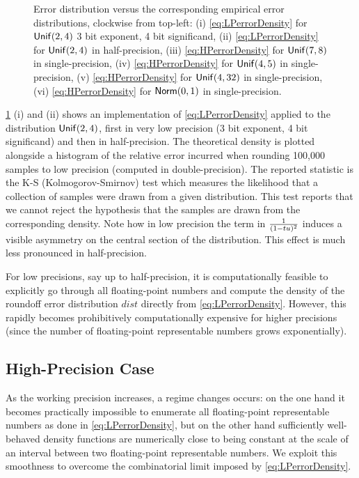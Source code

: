 \begin{figure}[tb]
\begin{tabular}{l l l}
\end{tabular}
\caption{Error distribution versus the corresponding empirical error distributions, clockwise from top-left: (i) \cref{eq:LPerrorDensity} for $\mathsf{Unif}(2,4)$ 3 bit exponent,  4 bit significand,  (ii) \cref{eq:LPerrorDensity} for $\mathsf{Unif}(2,4)$ in half-precision,  (iii) \cref{eq:HPerrorDensity} for $\mathsf{Unif}(7,8)$ in single-precision, (iv) \cref{eq:HPerrorDensity} for $\mathsf{Unif}(4,5)$ in single-precision, (v) \cref{eq:HPerrorDensity} for $\mathsf{Unif}(4,32)$ in single-precision, (vi) \cref{eq:HPerrorDensity} for $\mathsf{Norm}(0,1)$ in single-precision.}
\label{fig:error_dist}
\end{figure}

\cref{fig:error_dist} (i) and (ii) shows an implementation of \cref{eq:LPerrorDensity} applied to the distribution $\mathsf{Unif}(2,4)$, first in very low precision (3 bit exponent, 4 bit significand) and then in half-precision. The theoretical density is plotted alongside a histogram of the relative error incurred when rounding 100,000  samples to low precision (computed in double-precision).  The reported statistic is the K-S (Kolmogorov-Smirnov) test which measures the likelihood that a collection of samples were drawn from a given distribution. This test reports that we cannot reject the hypothesis that the samples are drawn from the corresponding density. Note how in low precision the term in $\frac{1}{(1-tu)^2}$ induces a visible asymmetry on the central section of the distribution. This effect is much less pronounced in half-precision.


For low precisions, say up to half-precision, it is computationally feasible to explicitly go through all floating-point numbers and compute the density of the roundoff error distribution $dist$ directly from \cref{eq:LPerrorDensity}. However, this rapidly becomes prohibitively computationally expensive for higher precisions (since the number of floating-point representable numbers grows exponentially).

\subsection{High-Precision Case} \label{subsec:HPerror_dist}

As the working precision increases, a regime changes occurs: on the one hand it becomes practically impossible to enumerate all floating-point representable numbers as done in \cref{eq:LPerrorDensity}, but on the other hand sufficiently well-behaved density functions are numerically close to being constant at the scale of an interval between two floating-point representable numbers. We exploit this smoothness to overcome the combinatorial limit imposed by \cref{eq:LPerrorDensity}.

